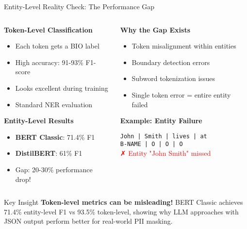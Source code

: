 \documentclass[aspectratio=169]{beamer}
\begin{document}
\begin{frame}{Entity-Level Reality Check: The Performance Gap}
\begin{columns}
\begin{column}{0.5\textwidth}
\textbf{Token-Level Classification}
\begin{itemize}
\item Each token gets a BIO label
\item High accuracy: 91-93\% F1-score
\item Looks excellent during training
\item Standard NER evaluation
\end{itemize}

\vspace{0.3cm}
\textbf{Entity-Level Results}
\begin{itemize}
\item \textbf{BERT Classic}: 71.4\% F1
\item \textbf{DistilBERT}: 61\% F1
\item Gap: 20-30\% performance drop!
\end{itemize}
\end{column}
\begin{column}{0.5\textwidth}
\textbf{Why the Gap Exists}
\begin{itemize}
\item Token misalignment within entities
\item Boundary detection errors
\item Subword tokenization issues
\item Single token error = entire entity failed
\end{itemize}

\vspace{0.3cm}
\textbf{Example: Entity Failure}
\begin{center}
\texttt{John | Smith | lives | at}\\
\texttt{B-NAME | O | O | O}\\
\textcolor{red}{✗ Entity "John Smith" missed}
\end{center}
\end{column}
\end{columns}

\vspace{0.3cm}
\begin{alertblock}{Key Insight}
\textbf{Token-level metrics can be misleading!} BERT Classic achieves 71.4\% entity-level F1 vs 93.5\% token-level, showing why LLM approaches with JSON output perform better for real-world PII masking.
\end{alertblock}
\end{frame}
\end{document}
